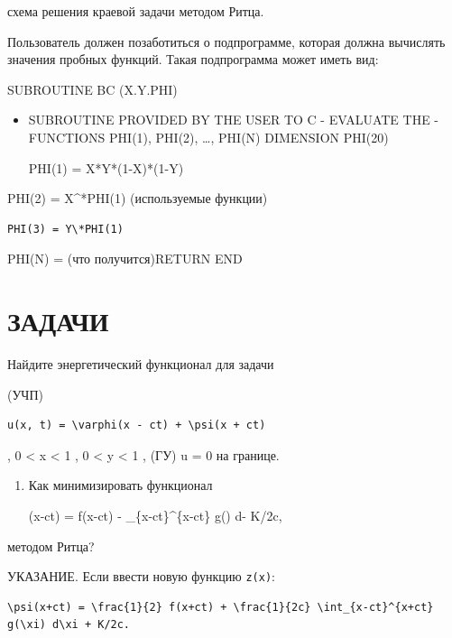 \documentclass[
  ukrainian,
]{article}
\begin{document}
схема решения краевой задачи методом Ритца.

Пользователь должен позаботиться о подпрограмме, которая должна
вычислять значения пробных функций. Такая подпрограмма может иметь вид:

SUBROUTINE BC (X.Y.PHI)

\begin{itemize}
\item
  SUBROUTINE PROVIDED BY THE USER TO C - EVALUATE THE - FUNCTIONS
  PHI(1), PHI(2), \ldots, PHI(N) DIMENSION PHI(20)

  PHI(1) = X*Y*(1-X)*(1-Y)
\end{itemize}

PHI(2) = X\^{}*PHI(1) (используемые функции)

\begin{verbatim}
PHI(3) = Y\*PHI(1)
\end{verbatim}

PHI(N) = (что получится)RETURN END

\section{\texorpdfstring{\textbf{ЗА}ДАЧИ}{ЗАДАЧИ}}\label{ux437ux430ux434ux430ux447ux438}

Найдите энергетический функционал для задачи

(УЧП)

\begin{verbatim}
u(x, t) = \varphi(x - ct) + \psi(x + ct)
\end{verbatim}

, 0 \textless{} x \textless{} 1 , 0 \textless{} y \textless{} 1 , (ГУ) u
= 0 на границе.

\begin{enumerate}
\def\labelenumi{\arabic{enumi}.}
\setcounter{enumi}{1}
\item
  Как минимизировать функционал

  \varphi(x-ct) =  f(x-ct) - 
  \int\_\{x-ct\}\^{}\{x-ct\} g(\xi) d\xi - K/2c,
\end{enumerate}

методом Ритца?

УКАЗАНИЕ. Если ввести новую функцию \texttt{z(x)}:

\begin{verbatim}
\psi(x+ct) = \frac{1}{2} f(x+ct) + \frac{1}{2c} \int_{x-ct}^{x+ct} g(\xi) d\xi + K/2c.
\end{verbatim}
\end{document}
